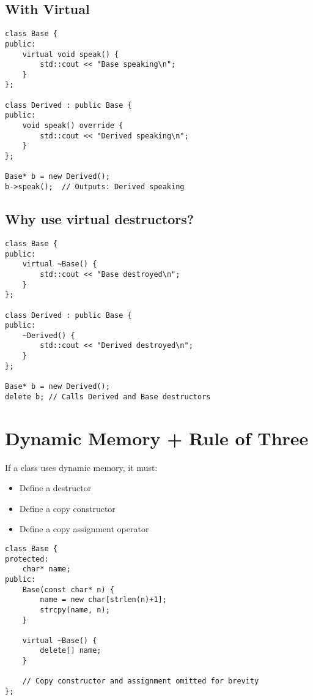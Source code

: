 \documentclass{article}
\begin{document}
\subsection{With Virtual}

\begin{lstlisting}[style=cppstyle]
class Base {
public:
    virtual void speak() {
        std::cout << "Base speaking\n";
    }
};

class Derived : public Base {
public:
    void speak() override {
        std::cout << "Derived speaking\n";
    }
};

Base* b = new Derived();
b->speak();  // Outputs: Derived speaking
\end{lstlisting}

\subsection*{Why use virtual destructors?}
\begin{lstlisting}[style=cppstyle]
class Base {
public:
    virtual ~Base() {
        std::cout << "Base destroyed\n";
    }
};

class Derived : public Base {
public:
    ~Derived() {
        std::cout << "Derived destroyed\n";
    }
};

Base* b = new Derived();
delete b; // Calls Derived and Base destructors
\end{lstlisting}

\section{Dynamic Memory + Rule of Three}
If a class uses dynamic memory, it must:
\begin{itemize}
    \item Define a destructor
    \item Define a copy constructor
    \item Define a copy assignment operator
\end{itemize}

\begin{lstlisting}[style=cppstyle]
class Base {
protected:
    char* name;
public:
    Base(const char* n) {
        name = new char[strlen(n)+1];
        strcpy(name, n);
    }

    virtual ~Base() {
        delete[] name;
    }

    // Copy constructor and assignment omitted for brevity
};
\end{lstlisting}
\end{document}
